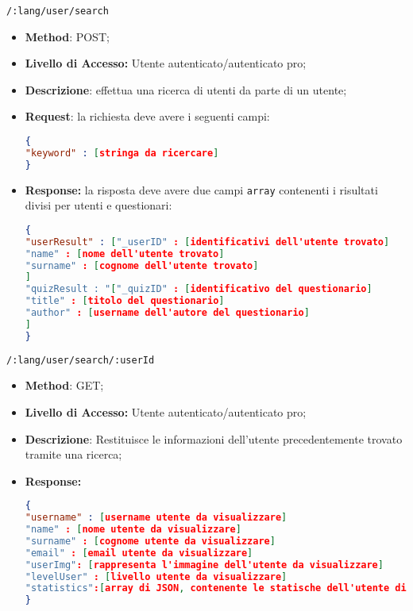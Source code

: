 	\item \texttt{/:lang/user/search}
	 \begin{itemize}
	 	\item \textbf{Method}: POST;
	 	\item \textbf{Livello di Accesso:} Utente autenticato/autenticato pro;
	 	\item \textbf{Descrizione}: effettua una ricerca di utenti da parte di un utente;
	 	\item \textbf{Request}: la richiesta deve avere i seguenti campi:
\begin{lstlisting}[language=json,firstnumber=1]
{
"keyword" : [stringa da ricercare]
}
\end{lstlisting} 
		\item \textbf{Response:} la risposta deve avere due campi \texttt{array} contenenti i risultati divisi per utenti e questionari:
\begin{lstlisting}[language=json,firstnumber=1]
{
"userResult" : ["_userID" : [identificativi dell'utente trovato]
"name" : [nome dell'utente trovato]
"surname" : [cognome dell'utente trovato]
]
"quizResult : "["_quizID" : [identificativo del questionario]
"title" : [titolo del questionario]
"author" : [username dell'autore del questionario]
]
}
\end{lstlisting}
	 \end{itemize}
	 
	 
	\item \texttt{/:lang/user/search/:userId}
	 \begin{itemize}
	 	\item \textbf{Method}: GET;
	 	\item \textbf{Livello di Accesso:} Utente autenticato/autenticato pro;
	 	\item \textbf{Descrizione}: Restituisce le informazioni dell'utente precedentemente trovato tramite una ricerca;
	 	\item \textbf{Response:} 
\begin{lstlisting}[language=json,firstnumber=1]
{
"username" : [username utente da visualizzare]
"name" : [nome utente da visualizzare]
"surname" : [cognome utente da visualizzare]
"email" : [email utente da visualizzare]
"userImg": [rappresenta l'immagine dell'utente da visualizzare]
"levelUser" : [livello utente da visualizzare]
"statistics":[array di JSON, contenente le statische dell'utente di ogni argomento]
}
\end{lstlisting}
	 \end{itemize}
	 
